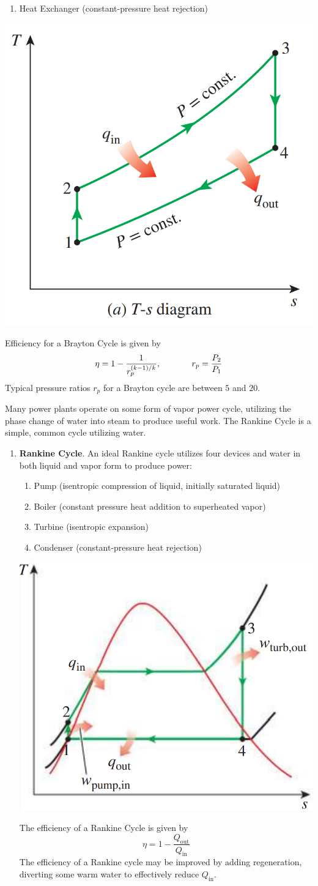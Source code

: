 \begin{enumerate}
\begin{enumerate}
        \item Heat Exchanger (constant-pressure heat rejection)
    \end{enumerate}
    \begin{center}
        \includegraphics[width=0.4\linewidth]{Images/thermo brayton.png}
    \end{center}
    Efficiency for a Brayton Cycle is given by \[\eta = 1-\frac{1}{r_p^{(k-1)/k}},\hspace{0.5in}r_p=\frac{P_2}{P_1}\] Typical pressure ratios $r_p$ for a Brayton cycle are between $5$ and $20$.
\end{enumerate}

\newpage

Many power plants operate on some form of vapor power cycle, utilizing the phase change of water into steam to produce useful work. The Rankine Cycle is a simple, common cycle utilizing water.

\begin{enumerate}
    \item[] \textbf{Rankine Cycle}. An ideal Rankine cycle utilizes four devices and water in both liquid and vapor form to produce power:
    \begin{enumerate}
        \item Pump (isentropic compression of liquid, initially saturated liquid)
        \item Boiler (constant pressure heat addition to superheated vapor)
        \item Turbine (isentropic expansion)
        \item Condenser (constant-pressure heat rejection)
    \end{enumerate}
    \begin{center}
        \includegraphics[width=0.4\linewidth]{Images/thermo rankine.png}
    \end{center}
    The efficiency of a Rankine Cycle is given by \[\eta = 1 - \frac{Q_\text{out}}{Q_\text{in}}\] The efficiency of a Rankine cycle may be improved by adding regeneration, diverting some warm water to effectively reduce $Q_\text{in}$.
\end{enumerate}

